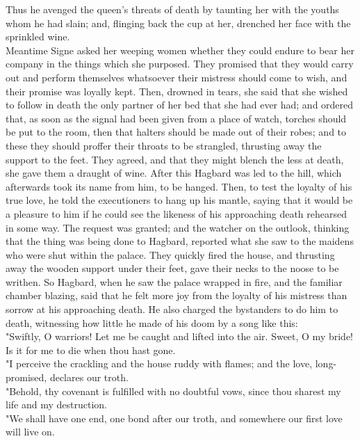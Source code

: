 \documentclass[10pt,a4paper]{report}
\begin{document}
Thus he avenged the queen's threats of death by taunting her with the youths whom he had slain; and, flinging back the cup at her, drenched her face with the sprinkled wine.\\

Meantime Signe asked her weeping women whether they could endure to bear her company in the things which she purposed. They promised that they would carry out and perform themselves whatsoever their mistress should come to wish, and their promise was loyally kept. Then, drowned in tears, she said that she wished to follow in death the only partner of her bed that she had ever had; and ordered that, as soon as the signal had been given from a place of watch, torches should be put to the room, then that halters should be made out of their robes; and to these they should proffer their throats to be strangled, thrusting away the support to the feet. They agreed, and that they might blench the less at death, she gave them a draught of wine. After this Hagbard was led to the hill, which afterwards took its name from him, to be hanged. Then, to test the loyalty of his true love, he told the executioners to hang up his mantle, saying that it would be a pleasure to him if he could see the likeness of his approaching death rehearsed in some way. The request was granted; and the watcher on the outlook, thinking that the thing was being done to Hagbard, reported what she saw to the maidens who were shut within the palace. They quickly fired the house, and thrusting away the wooden support under their feet, gave their necks to the noose to be writhen. So Hagbard, when he saw the palace wrapped in fire, and the familiar chamber blazing, said that he felt more joy from the loyalty of his mistress than sorrow at his approaching death. He also charged the bystanders to do him to death, witnessing how little he made of his doom by a song like this:\\

"Swiftly, O warriors! Let me be caught and lifted into the air. Sweet, O my bride! Is it for me to die when thou hast gone.\\

"I perceive the crackling and the house ruddy with flames; and the love, long-promised, declares our troth.\\

"Behold, thy covenant is fulfilled with no doubtful vows, since thou sharest my life and my destruction.\\

"We shall have one end, one bond after our troth, and somewhere our first love will live on.\\
\end{document}
